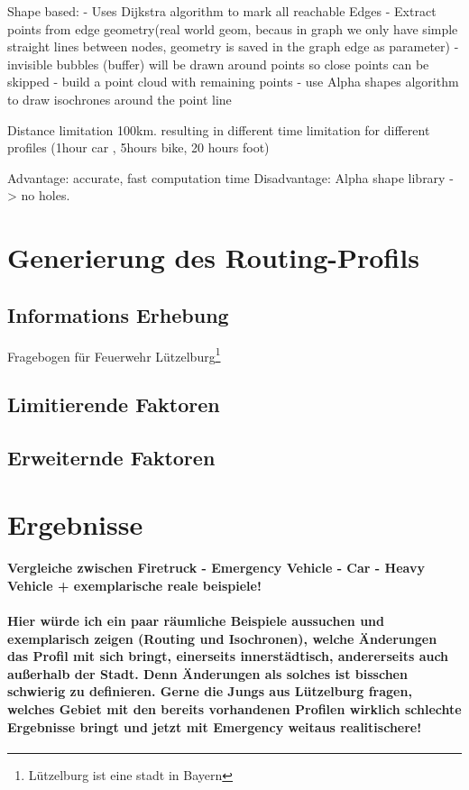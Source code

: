 \documentclass[10pt,a4paper]{article}
\begin{document}
Shape based:
- Uses Dijkstra algorithm to mark all reachable Edges
- Extract points from edge geometry(real world geom, becaus in graph we only have simple straight lines between nodes, geometry is saved in the graph edge as parameter)
- invisible bubbles (buffer) will be drawn around points so close points can be skipped
- build a point cloud with remaining points
- use Alpha shapes algorithm to draw isochrones around the point line

 Distance limitation 100km. resulting in different time limitation for different profiles (1hour car , 5hours bike, 20 hours foot)

Advantage: accurate, fast computation time
Disadvantage: Alpha shape library -> no holes.



\section{Generierung des Routing-Profils}

\subsection{Informations Erhebung}
Fragebogen für Feuerwehr Lützelburg\footnote{Lützelburg ist eine stadt in Bayern}

\subsection{Limitierende Faktoren}

\subsection{Erweiternde Faktoren}

\section{Ergebnisse}
\paragraph{
Vergleiche zwischen Firetruck - Emergency Vehicle - Car - Heavy Vehicle
+ exemplarische reale beispiele!
}
\paragraph{
\color{red}
Hier würde ich ein paar räumliche Beispiele aussuchen und exemplarisch zeigen (Routing und Isochronen), welche Änderungen das Profil mit sich bringt, einerseits innerstädtisch, andererseits auch außerhalb der Stadt. Denn Änderungen als solches ist bisschen schwierig zu definieren. Gerne die Jungs aus Lützelburg fragen, welches Gebiet mit den bereits vorhandenen Profilen wirklich schlechte Ergebnisse bringt und jetzt mit Emergency weitaus realitischere!
}
\end{document}
